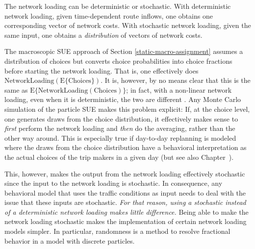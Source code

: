The network loading can be deterministic or stochastic.  
%
With deterministic network loading, given time-dependent route inflows,
one obtains one corresponding vector of network costs.
%
%
With stochastic network loading, given the same input, one obtains a
\emph{distribution} of vectors of network costs.

The macroscopic SUE approach of Section \ref{static-macro-assignment}
assumes a distribution of choices but
converts choice probabilities into choice fractions before starting
the network loading.  That is, one effectively does 
$\text{NetworkLoading}( \text{E}\{ \text{Choices} \})$.  
It is, however, by no means clear that this is the same as 
$\text{E}\{ \text{NetworkLoading}( \text{Choices} ) \}$; 
in fact, with a non-linear network loading, even when it is deterministic,
the two are different \citep{cascetta-1989}. Any Monte Carlo simulation of
the particle SUE makes this problem explicit: If, at the choice level,
one generates draws from the choice distribution, it effectively makes
sense to \emph{first} perform the network loading and \emph{then} do
the averaging, rather than the other way around.
This is especially true if day-to-day replanning is modeled where
the draws from the choice distribution have a
behavioral interpretation as the actual choices of the trip makers
in a given day (but see also Chapter~).

This, however, makes the output from the network loading effectively
stochastic since the input to the network loading is stochastic.  In
consequence, any behavioral model that uses the traffic conditions as
input needs to deal with the issue that these inputs are stochastic.
\emph{For that reason, using a stochastic instead of a deterministic network
loading makes little difference.}  Being able to
make the network loading stochastic makes the implementation of
certain network loading models simpler.  
In particular, randomness is a method to
resolve fractional behavior in a model with discrete particles.


